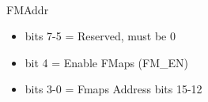 \\
FMAddr
\begin{itemize}
\item bits 7-5 = Reserved, must be 0
\item bit 4 = Enable FMaps (FM\_EN)
\item bits 3-0 = Fmaps Address bits 15-12
\end{itemize}

